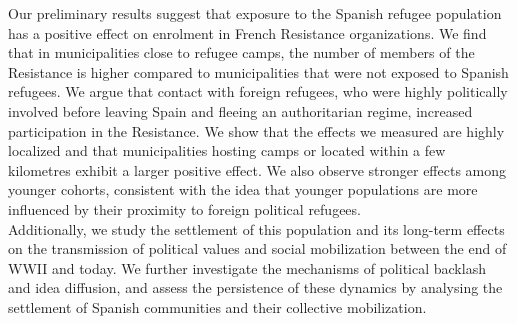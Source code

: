Our preliminary results suggest that exposure to the Spanish refugee population has a positive effect on enrolment in French Resistance organizations. We find that in municipalities close to refugee camps, the number of members of the Resistance is higher compared to municipalities that were not exposed to Spanish refugees. We argue that contact with foreign refugees, who were highly politically involved before leaving Spain and fleeing an authoritarian regime, increased participation in the Resistance. We show that the effects we measured are highly localized and that municipalities hosting camps or located within a few kilometres exhibit a larger positive effect. We also observe stronger effects among younger cohorts, consistent with the idea that younger populations are more influenced by their proximity to foreign political refugees. \\

Additionally, we study the settlement of this population and its long-term effects on the transmission of political values and social mobilization between the end of WWII and today. We further investigate the mechanisms of political backlash and idea diffusion, and assess the persistence of these dynamics by analysing the settlement of Spanish communities and their collective mobilization. \



\clearpage
\begin{singlespace}
%



\end{singlespace}





